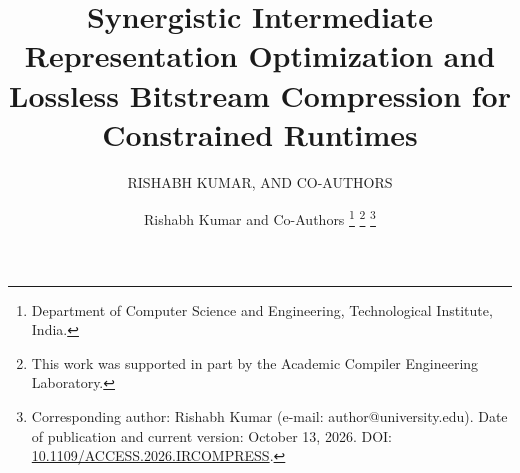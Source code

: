 \documentclass{ieeeaccess}
\begin{document}
\ifieeeaccess %
\fi

\title{Synergistic Intermediate Representation Optimization and Lossless Bitstream Compression for Constrained Runtimes}

\ifieeeaccess %
\author{\uppercase{Rishabh Kumar}, \uppercase{and Co-Authors}}
\address[1]{Department of Computer Science and Engineering, Technological Institute, India}


\else
\author{Rishabh Kumar and Co-Authors
\thanks{Department of Computer Science and Engineering, Technological Institute, India.}
\thanks{This work was supported in part by the Academic Compiler Engineering Laboratory.}
\thanks{Corresponding author: Rishabh Kumar (e-mail: author@university.edu). Date of publication and current version: October 13, 2026. DOI: \protect\url{10.1109/ACCESS.2026.IRCOMPRESS}.}} %
\fi
\ifieeeaccess\else\maketitle\fi
\end{document}
